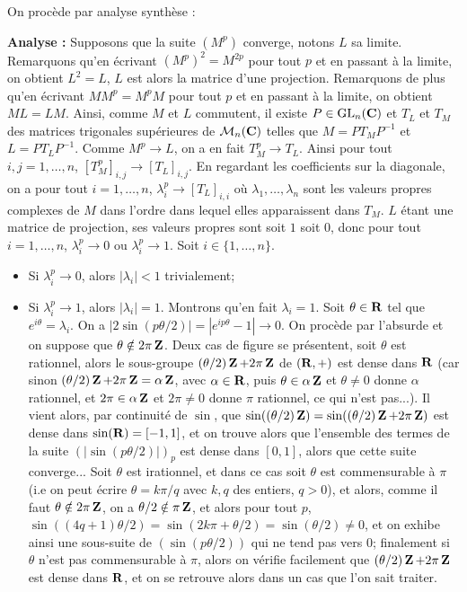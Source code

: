 \begin{correction}
    On procède par analyse synthèse :

    \textbf{Analyse :} Supposons que la suite $(M^p)$ converge, notons $L$ sa limite.
    Remarquons qu'en écrivant $(M^p)^2=M^{2p}$ pour tout $p$ et en passant à la limite, on obtient $L^2=L$,
    $L$ est alors la matrice d'une projection. Remarquons de plus qu'en écrivant $MM^p=M^pM$ pour tout $p$ et en passant à la limite, on obtient $ML=LM$.
    Ainsi, comme $M$ et $L$ commutent, il existe $P\in\operatorname{\mathrm{GL}}_n(\operatorname{\mathbf{C}})$ et $T_L$ et $T_M$ des matrices trigonales supérieures de $\mathcal M_n(\operatorname{\mathbf{C}})$ telles que 
    $M=PT_MP^{-1}$ et $L=PT_LP^{-1}$. 
    Comme $M^p\to L$, on a en fait $T_M^p\to T_L$. 
    Ainsi pour tout $i,j=1,\dots,n$, $[T_M^p]_{i,j}\to [T_L]_{i,j}$.
    En regardant les coefficients sur la diagonale, on a pour tout $i=1,\dots,n$, $\lambda_i^p\to [T_L]_{i,i}$
    où $\lambda_1,\dots,\lambda_n$ sont les valeurs propres complexes de $M$ dans l'ordre dans lequel elles apparaissent dans $T_M$.
    $L$ étant une matrice de projection, ses valeurs propres sont soit $1$ soit $0$, donc pour tout $i=1,\dots,n$,
    $\lambda_i^p\to 0$ ou $\lambda_i^p\to 1$.
    Soit $i\in\lbrace1,\dots,n\rbrace$.
    \begin{itemize}
        \item Si $\lambda_i^p\to 0$, alors $|\lambda_i|<1$ trivialement;
        \item Si $\lambda_i^p\to 1$, alors $|\lambda_i|=1$. 
        Montrons qu'en fait $\lambda_i=1$. 
        Soit $\theta\in\operatorname{\mathbf{R}}$ tel que $e^{i\theta}=\lambda_i$.
        On a $|2\sin(p\theta/2)|=|e^{ip\theta}-1|\to 0$. 
        On procède par l'absurde et on suppose que $\theta \notin 2\pi\operatorname{\mathbf{Z}}$.
        Deux cas de figure se présentent, soit $\theta$ est rationnel, 
        alors le sous-groupe $(\theta/2)\operatorname{\mathbf{Z}}+2\pi\operatorname{\mathbf{Z}}$ de $(\operatorname{\mathbf{R}},+)$ est dense dans $\operatorname{\mathbf{R}}$
        (car sinon $(\theta/2)\operatorname{\mathbf{Z}}+2\pi\operatorname{\mathbf{Z}}=\alpha\operatorname{\mathbf{Z}}$, avec $\alpha\in\operatorname{\mathbf{R}}$, puis $\theta\in\alpha\operatorname{\mathbf{Z}}$ et $\theta\neq0$ donne $\alpha$ rationnel, et $2\pi\in\alpha\operatorname{\mathbf{Z}}$ et $2\pi\neq 0$ donne $\pi$ rationnel, ce qui n'est pas...).
        Il vient alors, par continuité de $\sin$, que $\sin((\theta/2)\operatorname{\mathbf{Z}})=\sin((\theta/2)\operatorname{\mathbf{Z}}+2\pi\operatorname{\mathbf{Z}})$ est dense dans $\sin(\operatorname{\mathbf{R}})=[-1,1]$, et on trouve alors 
        que l'ensemble des termes de la suite $(|\sin(p\theta/2)|)_p$ est dense dans $[0,1]$, alors que cette suite converge... 
        Soit $\theta$ est irationnel, et dans ce cas soit $\theta$ est commensurable à $\pi$ (i.e on peut écrire $\theta=k\pi/q$ avec $k,q$ des entiers, $q>0$),
        et alors, comme il faut $\theta\notin2\pi\operatorname{\mathbf{Z}}$, on a $\theta/2\notin\pi\operatorname{\mathbf{Z}}$, et alors pour tout $p$, $\sin((4q+1)\theta/2)=\sin(2k\pi+\theta/2)=\sin(\theta/2)\neq 0$,
        et on exhibe ainsi une sous-suite de $(\sin(p\theta/2))$ qui ne tend pas vers $0$; finalement si $\theta$ n'est pas commensurable à $\pi$, 
        alors on vérifie facilement que $(\theta/2)\operatorname{\mathbf{Z}}+2\pi\operatorname{\mathbf{Z}}$ est dense dans $\operatorname{\mathbf{R}}$, et on se retrouve alors dans un cas que l'on sait traiter.


\end{itemize}
\end{correction}
